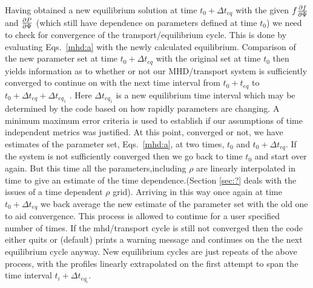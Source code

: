Having obtained a new equilibrium solution at time $t_0 +\Delta t_{eq}$  with the
given $f\frac{\partial{ f}}{\partial{ \Psi}} $ and $\frac{\partial{ P}}{\partial{ \Psi}}$ (which still have
dependence on parameters defined at time $t_0$) we need to check for
convergence of the transport/equilibrium cycle. This is done by
evaluating Eqs.~\eqref{mhd:a} with the newly calculated equilibrium.
Comparison of the new parameter set at time $t_0 +\Delta t_{eq}$ with the
original set at time ${t_0} $ then yields information as to whether
or not our MHD/transport system is sufficiently converged to
continue on with the next time interval from $t_0 + t_{eq}$ to $t_0 +
\Delta t_{eq} + \Delta t_{eq_1}$ . Here $\Delta t_{eq_1}$ is a new equilibrium time
interval which may be determined by the code based on how rapidly
parameters are changing.
A minimum maximum error criteria is used to establish if our
assumptions
of time independent metrics was justified. At this point, converged or
not, we have estimates of the parameter set, Eqs.~\eqref{mhd:a}, 
at two times, $t_0$ and $t_0 + \Delta t_{eq} $. If the system is not
sufficiently converged then we go back to time $t_0$ and start over
again. But this time all the parameters,including $\rho$ are linearly
interpolated in time to give an estimate of the time
dependence.(Section \ref{sec:?} deals with the issues of a time dependent $\rho$
grid). Arriving in this way once again at time $t_0 + \Delta t_{eq} $ we back
average the new estimate of the parameter set with the old one to aid
convergence. This process is allowed to continue for a user specified
number of times. If the mhd/transport cycle is still not converged
then the code either quits or (default) prints a warning message and
continues on the the next equilibrium cycle anyway. New equilibrium
cycles are just repeats of the above process, with the profiles
linearly extrapolated on the first attempt to span the time interval
$t_i + \Delta t_{eq_i}$. 


